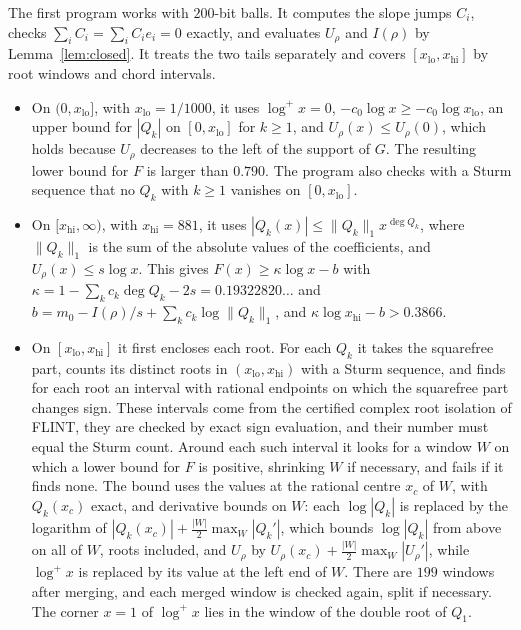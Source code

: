 \documentclass[11pt]{amsart}
\theoremstyle{remark}
\numberwithin{equation}{section}
\newcommand{\logp}{\log^{+}}
\newcommand{\Kappa}{0.19322820}
\newcommand{\XLO}{1/1000}
\newcommand{\XHI}{881}
\newcommand{\LTail}{0.790}
\newcommand{\RTail}{0.3866}
\newcommand{\NWinA}{199}
\begin{document}
The first program works with $200$-bit balls. It computes the slope jumps $C_i$, checks $\sum_iC_i=\sum_iC_ie_i=0$ exactly, and evaluates $U_\rho$ and $I(\rho)$ by Lemma~\ref{lem:closed}. It treats the two tails separately and covers $[x_{\mathrm{lo}},x_{\mathrm{hi}}]$ by root windows and chord intervals.
\begin{itemize}[leftmargin=1.5em]
\item On $(0,x_{\mathrm{lo}}]$, with $x_{\mathrm{lo}}=\XLO$, it uses $\logp x=0$, $-c_0\log x\ge-c_0\log x_{\mathrm{lo}}$, an upper bound for $|Q_k|$ on $[0,x_{\mathrm{lo}}]$ for $k\ge1$, and $U_\rho(x)\le U_\rho(0)$, which holds because $U_\rho$ decreases to the left of the support of $G$. The resulting lower bound for $F$ is larger than $\LTail$. The program also checks with a Sturm sequence that no $Q_k$ with $k\ge1$ vanishes on $[0,x_{\mathrm{lo}}]$.
\item On $[x_{\mathrm{hi}},\infty)$, with $x_{\mathrm{hi}}=\XHI$, it uses $|Q_k(x)|\le\|Q_k\|_1x^{\deg Q_k}$, where $\|Q_k\|_1$ is the sum of the absolute values of the coefficients, and $U_\rho(x)\le s\log x$. This gives $F(x)\ge\kappa\log x-b$ with $\kappa=1-\sum_kc_k\deg Q_k-2s=\Kappa\ldots$ and $b=m_0-I(\rho)/s+\sum_kc_k\log\|Q_k\|_1$, and $\kappa\log x_{\mathrm{hi}}-b>\RTail$.
\item On $[x_{\mathrm{lo}},x_{\mathrm{hi}}]$ it first encloses each root. For each $Q_k$ it takes the squarefree part, counts its distinct roots in $(x_{\mathrm{lo}},x_{\mathrm{hi}})$ with a Sturm sequence, and finds for each root an interval with rational endpoints on which the squarefree part changes sign. These intervals come from the certified complex root isolation of FLINT, they are checked by exact sign evaluation, and their number must equal the Sturm count. Around each such interval it looks for a window $W$ on which a lower bound for $F$ is positive, shrinking $W$ if necessary, and fails if it finds none. The bound uses the values at the rational centre $x_c$ of $W$, with $Q_k(x_c)$ exact, and derivative bounds on $W$: each $\log|Q_k|$ is replaced by the logarithm of $|Q_k(x_c)|+\frac{|W|}2\max_W|Q_k'|$, which bounds $\log|Q_k|$ from above on all of $W$, roots included, and $U_\rho$ by $U_\rho(x_c)+\frac{|W|}2\max_W|U_\rho'|$, while $\logp x$ is replaced by its value at the left end of $W$. There are $\NWinA$ windows after merging, and each merged window is checked again, split if necessary. The corner $x=1$ of $\logp x$ lies in the window of the double root of $Q_1$.

\end{itemize}
\end{document}
